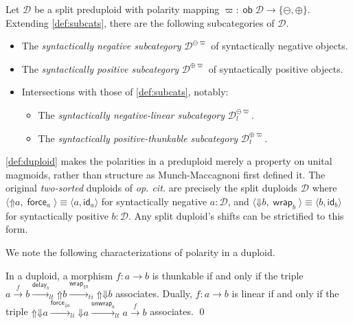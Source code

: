 \documentclass[runningheads]{llncs}
\makeatletter
\newcommand*{\opcit}{\textit{op.\@{} cit.\@}}
\newcommand*\rocqlogo{\usebox{\rocqlogobox}}
\newcommand{\lemmaref}[3]{\href{https://github.com/UniMath/UniMath/blob/94fae0eda57a778cec704bfa73b4ff525c9bc475/#1\#L#2?name=#3}{\rocqlogo}}
\newcommand{\acat}[1]{\mathcal{#1}}
\newcommand{\D}{\acat{D}}
\newcommand{\Cl}[1]{#1_l}
\newcommand{\Ct}[1]{#1_t}
\newcommand{\Cti}[1]{#1_{ti}}
\newcommand{\Cli}[1]{#1_{li}}
\newcommand{\Clt}[1]{#1_{lt}}
\newcommand{\Csn}[2]{#1^{\ominus#2}}
\newcommand{\Csp}[2]{#1^{\oplus#2}}
\newcommand{\Csnl}[2]{\Csn{\Cl{#1}}{#2}}
\newcommand{\Cspt}[2]{\Csp{\Ct{#1}}{#2}}
\DeclareMathOperator{\ob}{\mathsf{ob}}
\newcommand{\id}{\mathsf{id}}
\newcommand{\force}{\mathop{\mathsf{force}}\nolimits}
\newcommand{\delay}{\mathop{\mathsf{delay}}\nolimits}
\newcommand{\wrap}{\mathop{\mathsf{wrap}}\nolimits}
\newcommand{\unwrap}{\mathop{\mathsf{unwrap}}\nolimits}
\newcommand{\upshift}{\mathord{\Uparrow}}
\newcommand{\downshift}{\mathord{\Downarrow}}
\makeatother
\begin{document}
\begin{definition}[{\lemmaref{UniMath/CategoryTheory/Nonassociative/Duploids/PolarizedSubcategories.v}{43}{syn\_positive\_category}}]
\label{def:chosen-subcats}
Let \(\D\) be a split preduploid with polarity mapping \(\varpi \colon
\ob\D \to \{\ominus, \oplus\}\). Extending \autoref{def:subcats}, there are the
following subcategories of \(\D\).
\begin{itemize}
\item The \emph{syntactically negative subcategory} \(\Csn\D\varpi\) of syntactically
negative objects.
\item The \emph{syntactically positive subcategory} \(\Csp\D\varpi\) of syntactically
positive objects.
\item Intersections with those of \autoref{def:subcats}, notably:
\begin{itemize}
\item The \emph{syntactically negative\hyp{}linear subcategory}
\(\Csnl\D\varpi\).
\item The \emph{syntactically positive\hyp{}thunkable subcategory}
\(\Cspt\D\varpi\).
\end{itemize}
\end{itemize}
\end{definition}

\begin{remark}
\label{rem:twosorted}
\autoref{def:duploid} makes the polarities in a preduploid merely a property on
unital magmoids, rather than structure as Munch\hyp{}Maccagnoni
\cite{MunchMaccagnoni14} first defined it. The original
\emph{two\hyp{}sorted} duploids of \opcit{} are
precisely the split duploids \(\D\) where \(\langle \upshift{a},
\force_a \rangle \equiv \langle a, \id_a \rangle\) for syntactically
negative \(a : \D\), and \(\langle \downshift{b}, \wrap_b \rangle
\equiv \langle b, \id_b \rangle\) for syntactically positive \(b :
\D\). Any split duploid's shifts can be strictified to this form.
\end{remark}

We note the following characterizations of polarity in a duploid.

\begin{theorem}[{\lemmaref{UniMath/CategoryTheory/Nonassociative/Duploids/Core.v}{596}{is\_thunkable\_iff\_delay\_wrap} \cite[Proposition 13]{MunchMaccagnoni14}}]
\label{lem:thunkable-and-linear-chars}
In a duploid, a morphism \(f \colon a \to b\) is thunkable if and only
if the triple \(a \xrightarrow{f} b \Clt{\xrightarrow{\delay_b}}
\upshift{b} \Cti{\xrightarrow{\wrap_{\upshift{b}}}}
\upshift{\downshift{b}}\) associates. Dually, \(f \colon a \to b\) is
linear if and only if the triple
\(\upshift{\downshift{a}} \Cli{\xrightarrow{\force_{\downshift{a}}}}
\downshift{a} \Clt{\xrightarrow{\unwrap_{a}}} a \xrightarrow{f} b\)
associates.
\qed
\end{theorem}
\end{document}

